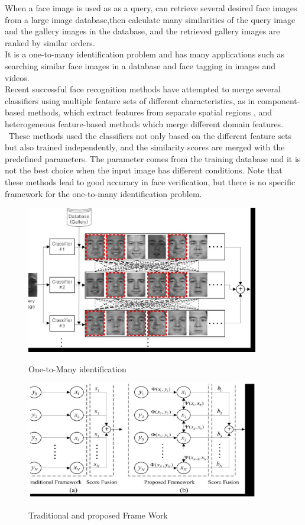 When  a face image is used as as a query,  can retrieve several desired face images from a large image database,then  calculate many similarities of the query image and the
gallery images in the database, and the retrieved gallery images are ranked by similar orders. \\It is a one-to-many identification problem  and has many applications such
as searching similar face images in a database and face tagging in images and videos.\
\\Recent successful face recognition methods have attempted to merge several classifiers using multiple feature sets of different characteristics, as in component-based methods, which extract features from separate spatial regions , and heterogeneous feature-based methods which merge different domain features. \ These methods used the classifiers not only based on the different feature sets but also trained independently, and the similarity scores are merged with the predefined parameters. The parameter comes from the training database and it is not the best choice when the input image has different conditions. Note that these methods lead to good accuracy in face verification, but there is no specific framework for the one-to-many identification problem.
\begin{figure}
  \includegraphics[width=4in]{face.eps}\\
  \caption{One-to-Many identification }\label{}
\end{figure}
\begin{figure}
  \includegraphics[width=4in]{classifier.eps}\\
  \caption{Traditional and proposed Frame Work}\label{}
\end{figure}

